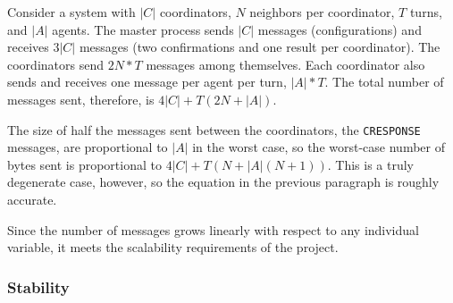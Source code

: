 Consider a system with $|C|$ coordinators, $N$ neighbors per coordinator, $T$ turns, and $|A|$ agents. The master process sends $|C|$ messages (configurations) and receives $3|C|$ messages (two confirmations and one result per coordinator). The coordinators send $2N*T$ messages among themselves. Each coordinator also sends and receives one message per agent per turn, $|A|*T$. The total number of messages sent, therefore, is $4|C|+T(2N+|A|)$.

The size of half the messages sent between the coordinators, the \texttt{CRESPONSE} messages, are proportional to $|A|$ in the worst case, so the worst-case number of bytes sent is proportional to $4|C|+T(N+|A|(N+1))$. This is a truly degenerate case, however, so the equation in the previous paragraph is roughly accurate.

Since the number of messages grows linearly with respect to any individual variable, it meets the scalability requirements of the project.

\subsubsection{Stability}


